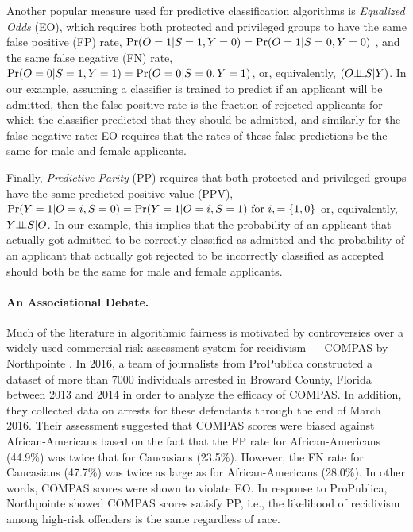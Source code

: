 \documentclass[11pt]{article}
\begin{document}
Another popular measure used for predictive
classification algorithms is  \textit{Equalized Odds} (EO), which
requires both protected and privileged groups to have the same false
positive (FP) rate, ${\tt \mathrm{Pr}}(O=1|S=1,Y=0)={\tt \mathrm{Pr}}(O=1|S=0,Y=0)$ , and the same
false negative (FN) rate, ${\tt \mathrm{Pr}}(O=0|S=1,Y=1)={\tt \mathrm{Pr}}(O=0|S=0,Y=1)$, or,
equivalently, $(O \mbox{$\perp\!\!\!\perp$} S|Y)$. In our example, assuming a classifier is trained to predict if an applicant will be admitted, then the false positive rate is the fraction of rejected applicants for which the classifier predicted that they should be admitted, and similarly for the false negative rate: EO requires that the rates of these false predictions be the same for male and female applicants.  Finally, \textit{Predictive Parity} (PP)
requires that both protected and privileged groups have the same
predicted positive value (PPV),
$\pr(Y=1|O=i,S=0)=\pr(Y=1|O=i,S=1) \ \textup{for} \ i,=\{1,0\}$ or,
equivalently, $Y \mbox{$\perp\!\!\!\perp$} S| O$. In our example, this
implies that the probability of an applicant that actually got admitted  to be correctly classified as admitted
and the probability of an applicant that actually got rejected 
to be incorrectly classified as accepted should both be the same for male and female applicants.
%
\vspace{-0.3cm}
\paragraph{An Associational Debate.} Much of the literature in algorithmic fairness is motivated by controversies over a widely used commercial risk assessment system for recidivism --- COMPAS by Northpointe \cite{larson2016we}. In 2016, a team of journalists from ProPublica constructed a dataset of more than 7000 individuals arrested in Broward County, Florida between 2013 and 2014 in order to analyze the efficacy of COMPAS.  In addition, they collected data on arrests for these defendants through the end of March 2016. Their assessment suggested that COMPAS scores were biased against African-Americans based on the fact that the 
FP rate for African-Americans (44.9\%) was twice that for Caucasians (23.5\%). However, the FN rate for Caucasians (47.7\%) was twice as large as for  African-Americans (28.0\%). 
In other words, COMPAS scores were shown to violate EO.
In response to ProPublica, Northpointe showed
COMPAS scores satisfy PP, i.e., the likelihood of recidivism among high-risk offenders is the same regardless of race. 
\end{document}
